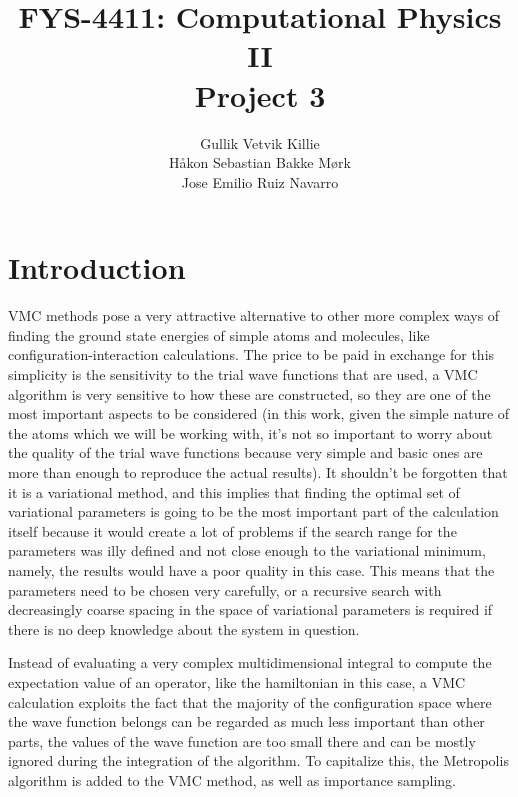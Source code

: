\documentclass[x11names]{article}
\title{ FYS-4411: Computational Physics II \\ Project 3 }
\author{Gullik Vetvik Killie\\
		Håkon Sebastian Bakke Mørk\\
		Jose Emilio Ruiz Navarro
		}
\begin{document}
\maketitle


\tableofcontents

\section{Introduction}
VMC methods pose a very attractive alternative to other more complex ways of finding the ground state energies of simple atoms and molecules, like configuration-interaction calculations. The price to be paid in exchange for this simplicity is the sensitivity to the trial wave functions that are used, a VMC algorithm is very sensitive to how these are constructed, so they are one of the most important aspects to be considered (in this work, given the simple nature of the atoms which we will be working with, it's not so important to worry about the quality of the trial wave functions because very simple and basic ones are more than enough to reproduce the actual results). It shouldn't be forgotten that it is a variational method, and this implies that finding the optimal set of variational parameters is going to be the most important part of the calculation itself because it would create a lot of problems if the search range for the parameters was illy defined and not close enough to the variational minimum, namely, the results would have a poor quality in this case. This means that the parameters need to be chosen very carefully, or a recursive search with decreasingly coarse spacing in the space of variational parameters is required if there is no deep knowledge about the system in question.

Instead of evaluating a very complex multidimensional integral to compute the expectation value of an operator, like the hamiltonian in this case, a VMC calculation exploits the fact that the majority of the configuration space where the wave function belongs can be regarded as much less important than other parts, the values of the wave function are too small there and can be mostly ignored during the integration of the algorithm. To capitalize this, the Metropolis algorithm is added to the VMC method, as well as importance sampling.
\end{document}
